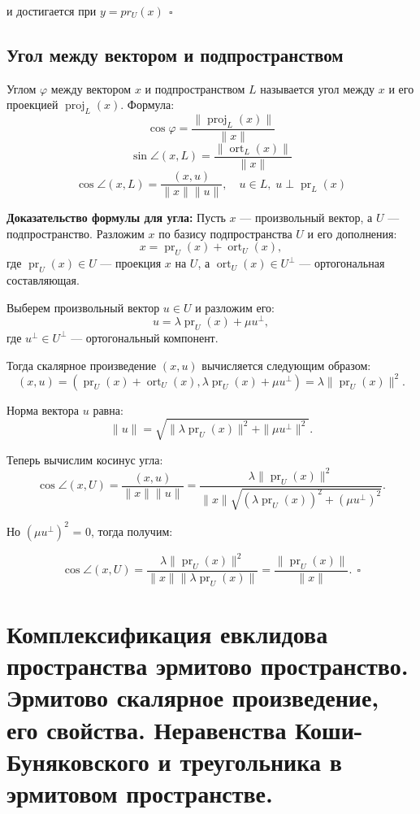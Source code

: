 \documentclass[12pt]{article}
\begin{document}
и достигается при $y = pr_U(x) \ \ \square$

\subsection{Угол между вектором и подпространством}
Углом $\varphi$ между вектором $x$ и подпространством $L$ называется угол между $x$ и его проекцией $\operatorname{proj}_L(x)$. Формула:
\[
\cos \varphi = \frac{\|\operatorname{proj}_L(x)\|}{\|x\|}
\]
\[
\sin \angle(x, L) = \frac{\|\operatorname{ort}_L(x)\|}{\|x\|}
\]
\[
\cos \angle(x, L) = \frac{(x, u)}{\|x\| \|u\|}, \quad u \in L, \; u \perp \operatorname{pr}_L(x)
\]

\textbf{Доказательство формулы для угла:}
Пусть $x$ — произвольный вектор, а $U$ — подпространство. Разложим $x$ по базису подпространства $U$ и его дополнения:
\[
x = \operatorname{pr}_U(x) + \operatorname{ort}_U(x),
\]
где $\operatorname{pr}_U(x) \in U$ — проекция $x$ на $U$, а $\operatorname{ort}_U(x) \in U^\perp$ — ортогональная составляющая.

Выберем произвольный вектор $u \in U$ и разложим его:
\[
u = \lambda \operatorname{pr}_U(x) + \mu u^\perp,
\]
где $u^\perp \in U^\perp$ — ортогональный компонент.

Тогда скалярное произведение $(x, u)$ вычисляется следующим образом:
\[
(x, u) = (\operatorname{pr}_U(x) + \operatorname{ort}_U(x), \lambda \operatorname{pr}_U(x) + \mu u^\perp) = \lambda \|\operatorname{pr}_U(x)\|^2.
\]

Норма вектора $u$ равна:
\[
\|u\| = \sqrt{\|\lambda \operatorname{pr}_U(x)\|^2 + \|\mu u^\perp\|^2}.
\]

Теперь вычислим косинус угла:
\[
\cos \angle(x, U) = \frac{(x, u)}{\|x\| \|u\|} = \frac{\lambda \|\operatorname{pr}_U(x)\|^2}{\|x\| \sqrt{(\lambda \operatorname{pr}_U(x))^2 + (\mu u^\perp)^2}}.
\]

Но $(\mu u^\perp)^2$ = 0, тогда получим:

\[
\cos \angle(x, U) = \frac{\lambda \|\operatorname{pr}_U(x)\|^2}{\|x\| \|\lambda \operatorname{pr}_U(x)\|} = \frac{\|\operatorname{pr}_U(x)\|}{\|x\|}. \ \ \square
\]

\section{Комплексификация евклидова пространства эрмитово пространство. Эрмитово скалярное произведение, его свойства. Неравенства Коши-Буняковского и треугольника в эрмитовом пространстве.}
\end{document}
